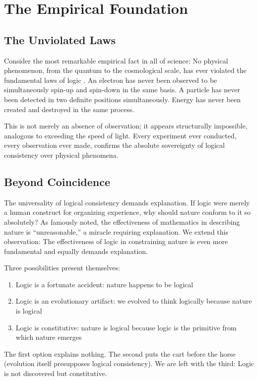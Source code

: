 \documentclass[12pt,a4paper]{article}
\begin{document}
\section{The Empirical Foundation}

\subsection{The Unviolated Laws}

Consider the most remarkable empirical fact in all of science: No physical phenomenon, from the quantum to the cosmological scale, has ever violated the fundamental laws of logic \citep{aristotle_metaphysics}. An electron has never been observed to be simultaneously spin-up and spin-down in the same basis. A particle has never been detected in two definite positions simultaneously. Energy has never been created and destroyed in the same process.

This is not merely an absence of observation; it appears structurally impossible, analogous to exceeding the speed of light. Every experiment ever conducted, every observation ever made, confirms the absolute sovereignty of logical consistency over physical phenomena.

\subsection{Beyond Coincidence}

The universality of logical consistency demands explanation. If logic were merely a human construct for organizing experience, why should nature conform to it so absolutely? As \citet{wigner1960unreasonable} famously noted, the effectiveness of mathematics in describing nature is ``unreasonable,'' a miracle requiring explanation. We extend this observation: The effectiveness of logic in constraining nature is even more fundamental and equally demands explanation.

Three possibilities present themselves:
\begin{enumerate}
\item Logic is a fortunate accident: nature happens to be logical
\item Logic is an evolutionary artifact: we evolved to think logically because nature is logical
\item Logic is constitutive: nature is logical because logic is the primitive from which nature emerges
\end{enumerate}

The first option explains nothing. The second puts the cart before the horse (evolution itself presupposes logical consistency). We are left with the third: Logic is not discovered but constitutive.
\end{document}

